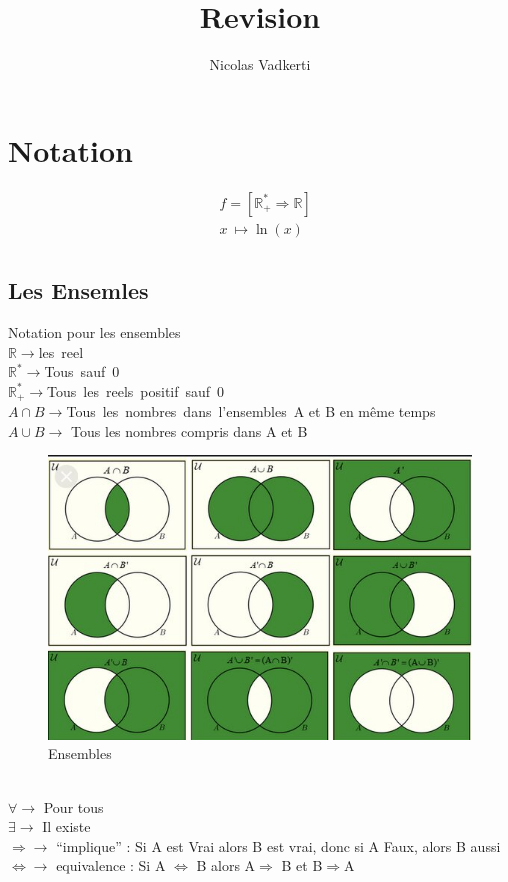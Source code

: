 \documentclass[10pt,a4paper]{article}
\title{Revision}
\author{Nicolas Vadkerti}
\newcommand{\reels}{\mathbb{R}}
\begin{document}
\maketitle
\section{Notation}

 \begin{equation}\label{xx}
\begin{split}
&f = [ \reels^{*}_{+}\Rightarrow\reels] \\
&x\ \mapsto \ln(x)\\
\end{split}
\end{equation}
\subsection{Les Ensemles}
Notation pour les ensembles \\
$\reels \rightarrow $les\ reel\\
$\reels^{*}\rightarrow $Tous\ sauf\ 0 \\
$\reels^{*}_{+} \rightarrow $Tous\ les\ reels\ positif\ sauf\ 0 \\
$A\cap B \rightarrow  $Tous\ les\ nombres\ dans\ l'ensembles\ A et B en même temps\\
$A\cup B \rightarrow$ Tous les nombres compris dans A et B 
\begin{figure}[h!]
\centering
\includegraphics[scale=0.30]{image/ensemble.jpg}
\caption{Ensembles}
\label{fig:net}
\end{figure}\\
$\forall \rightarrow$ Pour tous\\
$\exists \rightarrow$ Il existe\\
$\Rightarrow\rightarrow$ ``implique'' : Si A est Vrai alors B est vrai, donc si A Faux, alors B aussi\\
$\Leftrightarrow \rightarrow$ equivalence : Si A $\Leftrightarrow$ B alors A$\Rightarrow$ B et B$\Rightarrow$A
\end{document}
